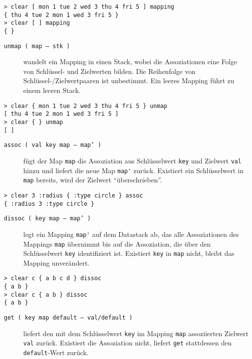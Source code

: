 \begin{verbatim}
> clear [ mon 1 tue 2 wed 3 thu 4 fri 5 ] mapping
{ thu 4 tue 2 mon 1 wed 3 fri 5 }
> clear [ ] mapping
{ }
\end{verbatim}

\begin{description}
\item[\texttt{unmap ( map -- stk )}] wandelt ein Mapping in einen Stack, wobei die Assoziationen eine Folge von Schlüssel- und Zielwerten bilden. Die Reihenfolge von Schlüssel-/Zielwertpaaren ist unbestimmt. Ein leeres Mapping führt zu einem leeren Stack.
\end{description}

\begin{verbatim}
> clear { mon 1 tue 2 wed 3 thu 4 fri 5 } unmap
[ thu 4 tue 2 mon 1 wed 3 fri 5 ]
> clear { } unmap
[ ]
\end{verbatim}

\begin{description}
\item[\texttt{assoc ( val key map -- map' )}] fügt der Map \verb|map| die Assoziation aus Schlüsselwert \verb|key| und Zielwert \verb|val| hinzu und liefert die neue Map \verb|map'| zurück. Existiert ein Schlüsselwert in \verb|map| bereits, wird der Zielwert "`überschrieben"'.
\end{description}

\begin{verbatim}
> clear 3 :radius { :type circle } assoc
{ :radius 3 :type circle }
\end{verbatim}

\begin{description}
\item[\texttt{dissoc ( key map -- map' )}] legt ein Mapping \verb|map'| auf dem Datastack ab, das alle Assoziationen des Mappings \verb|map| übernimmt bis auf die Assoziation, die über den Schlüsselwert \verb|key| identifiziert ist. Existiert \verb|key| in \verb|map| nicht, bleibt das Mapping unverändert.
\end{description}

\begin{verbatim}
> clear c { a b c d } dissoc
{ a b }
> clear c { a b } dissoc
{ a b }
\end{verbatim}

\begin{description}
\item[\texttt{get ( key map default -- val/default )}] liefert den mit dem Schlüsselwert \verb|key| im Mapping \verb|map| assoziierten Zielwert \verb|val| zurück. Existiert die Assoziation nicht, liefert \verb|get| stattdessen den \verb|default|-Wert zurück.
\end{description}

